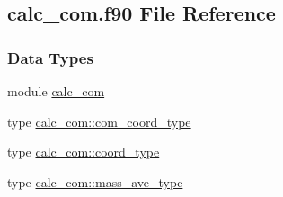 \hypertarget{calc__com_8f90}{\subsection{calc\-\_\-com.\-f90 File Reference}
\label{calc__com_8f90}
}
\subsubsection*{Data Types}
\begin{DoxyCompactItemize}
\item 
module \hyperlink{classcalc__com}{calc\-\_\-com}
\item 
type \hyperlink{structcalc__com_1_1com__coord__type}{calc\-\_\-com\-::com\-\_\-coord\-\_\-type}
\item 
type \hyperlink{structcalc__com_1_1coord__type}{calc\-\_\-com\-::coord\-\_\-type}
\item 
type \hyperlink{structcalc__com_1_1mass__ave__type}{calc\-\_\-com\-::mass\-\_\-ave\-\_\-type}
\end{DoxyCompactItemize}
